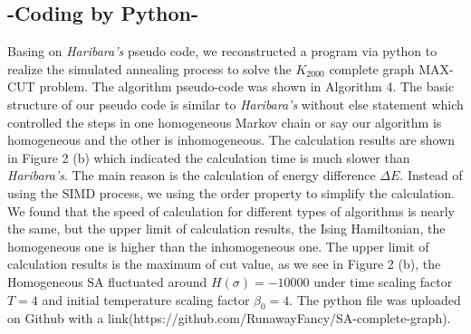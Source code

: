 \documentclass{turabian-researchpaper}
\begin{document}
    \subsection{-Coding by Python-}
        Basing on \textit{Haribara's} pseudo code, we reconstructed a program via python to realize the simulated annealing process to solve the $K_{2000}$ complete graph MAX-CUT problem. The algorithm pseudo-code was shown in Algorithm 4. The basic structure of our pseudo code is similar to \textit{Haribara's} without else statement which controlled the steps in one homogeneous Markov chain or say our algorithm is homogeneous and the other is inhomogeneous. The calculation results are shown in Figure 2 (b) which indicated the calculation time is much slower than \textit{Haribara's}. The main reason is the calculation of energy difference $\Delta E$. Instead of using the SIMD process, we using the order property to simplify the calculation. We found that the speed of calculation for different types of algorithms is nearly the same, but the upper limit of calculation results, the Ising Hamiltonian, the homogeneous one is higher than the inhomogeneous one. The upper limit of calculation results is the maximum of cut value, as we see in Figure 2 (b), the Homogeneous SA fluctuated around $H(\sigma) = -10000$ under time scaling factor $T = 4$ and initial temperature scaling factor $\beta_0 = 4$. The python file was uploaded on Github with a link(https://github.com/RunawayFancy/SA-complete-graph).
\end{document}
